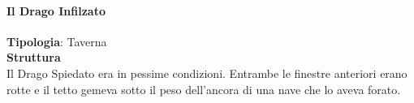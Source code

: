 \documentclass{article}
\begin{document}
\paragraph{}
\paragraph{}
\paragraph{}
\paragraph{}
\paragraph{}
\paragraph{}
\paragraph{}
\paragraph{}
\paragraph{}
\paragraph{Il Drago Infilzato} 
\textbf{Tipologia}: Taverna \\
\textbf{Struttura}\\
Il Drago Spiedato era in pessime condizioni. Entrambe le finestre anteriori erano rotte e il tetto gemeva sotto il peso dell'ancora di una nave che lo aveva forato.
\paragraph{}
\paragraph{}
\paragraph{}
\paragraph{}
\end{document}
